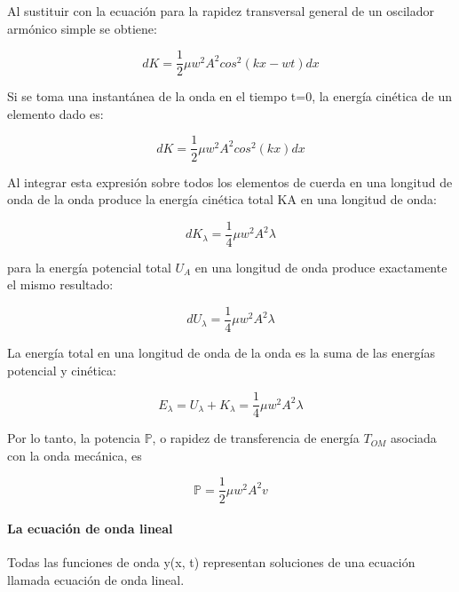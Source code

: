 \documentclass[10pt]{article}
\begin{document}
Al sustituir con la ecuación para la rapidez transversal general 
de un oscilador armónico simple se obtiene:

\begin{equation*}
    dK = \frac{1}{2} \mu w^2 A^2 cos^2 (kx-wt) dx 
\end{equation*}

Si se toma una instantánea de la onda en el tiempo t=0, la energía cinética de un elemento dado es:

\begin{equation*}
    dK = \frac{1}{2} \mu w^2 A^2 cos^2 (kx) dx 
\end{equation*}

Al integrar esta expresión sobre todos los elementos de cuerda en una longitud de onda
de la onda produce la energía cinética total KA en una longitud de onda:

\begin{equation*}
    dK_\lambda = \frac{1}{4} \mu w^2 A^2 \lambda 
\end{equation*}

para la energía potencial total $U_A$
en una longitud de onda produce exactamente el mismo resultado:

\begin{equation*}
    dU_\lambda = \frac{1}{4} \mu w^2 A^2 \lambda 
\end{equation*}

La energía total en una longitud de onda de la onda es la suma de las energías potencial
y cinética:

\begin{equation*}
    E_\lambda = U_\lambda + K_\lambda =  \frac{1}{4} \mu w^2 A^2 \lambda 
\end{equation*}

Por lo tanto, la potencia $\mathbb{P}$, o rapidez de transferencia de energía $T_{OM}$ asociada
con la onda mecánica, es

\begin{equation*}
    \mathbb{P} = \frac{1}{2} \mu w^2 A^2 v
\end{equation*}

\paragraph{La ecuación de onda lineal}

Todas las funciones de onda y(x, t) representan soluciones de
una ecuación llamada ecuación de onda lineal.
\end{document}
